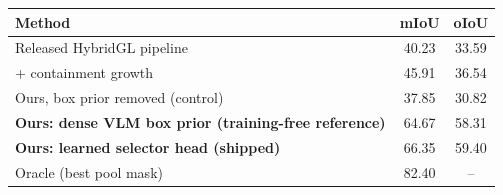 \begin{tabular}{lcc}
\toprule
Method & mIoU & oIoU \\
\midrule
Released HybridGL pipeline & 40.23 & 33.59 \\
+ containment growth & 45.91 & 36.54 \\
Ours, box prior removed (control) & 37.85 & 30.82 \\
\textbf{Ours: dense VLM box prior (training-free reference)} & 64.67 & 58.31 \\
\textbf{Ours: learned selector head (shipped)} & 66.35 & 59.40 \\
\midrule
Oracle (best pool mask) & 82.40 & -- \\
\bottomrule
\end{tabular}
